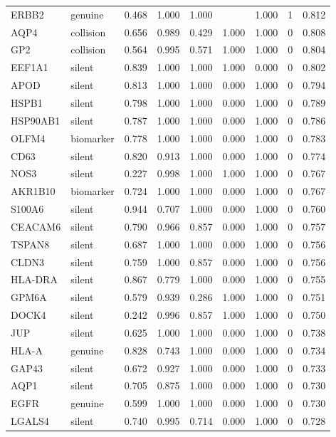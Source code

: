 \begin{longtable}{llrrrrrrr}
ERBB2 & genuine & 0.468 & 1.000 & 1.000 &  & 1.000 & 1 & 0.812\\
AQP4 & collision & 0.656 & 0.989 & 0.429 & 1.000 & 1.000 & 0 & 0.808\\
GP2 & collision & 0.564 & 0.995 & 0.571 & 1.000 & 1.000 & 0 & 0.804\\
EEF1A1 & silent & 0.839 & 1.000 & 1.000 & 1.000 & 0.000 & 0 & 0.802\\
APOD & silent & 0.813 & 1.000 & 1.000 & 0.000 & 1.000 & 0 & 0.794\\
HSPB1 & silent & 0.798 & 1.000 & 1.000 & 0.000 & 1.000 & 0 & 0.789\\
HSP90AB1 & silent & 0.787 & 1.000 & 1.000 & 0.000 & 1.000 & 0 & 0.786\\
OLFM4 & biomarker & 0.778 & 1.000 & 1.000 & 0.000 & 1.000 & 0 & 0.783\\
CD63 & silent & 0.820 & 0.913 & 1.000 & 0.000 & 1.000 & 0 & 0.774\\
NOS3 & silent & 0.227 & 0.998 & 1.000 & 1.000 & 1.000 & 0 & 0.767\\
AKR1B10 & biomarker & 0.724 & 1.000 & 1.000 & 0.000 & 1.000 & 0 & 0.767\\
S100A6 & silent & 0.944 & 0.707 & 1.000 & 0.000 & 1.000 & 0 & 0.760\\
CEACAM6 & silent & 0.790 & 0.966 & 0.857 & 0.000 & 1.000 & 0 & 0.757\\
TSPAN8 & silent & 0.687 & 1.000 & 1.000 & 0.000 & 1.000 & 0 & 0.756\\
CLDN3 & silent & 0.759 & 1.000 & 0.857 & 0.000 & 1.000 & 0 & 0.756\\
HLA-DRA & silent & 0.867 & 0.779 & 1.000 & 0.000 & 1.000 & 0 & 0.755\\
GPM6A & silent & 0.579 & 0.939 & 0.286 & 1.000 & 1.000 & 0 & 0.751\\
DOCK4 & silent & 0.242 & 0.996 & 0.857 & 1.000 & 1.000 & 0 & 0.750\\
JUP & silent & 0.625 & 1.000 & 1.000 & 0.000 & 1.000 & 0 & 0.738\\
HLA-A & genuine & 0.828 & 0.743 & 1.000 & 0.000 & 1.000 & 0 & 0.734\\
GAP43 & silent & 0.672 & 0.927 & 1.000 & 0.000 & 1.000 & 0 & 0.733\\
AQP1 & silent & 0.705 & 0.875 & 1.000 & 0.000 & 1.000 & 0 & 0.730\\
EGFR & genuine & 0.599 & 1.000 & 1.000 & 0.000 & 1.000 & 0 & 0.730\\
LGALS4 & silent & 0.740 & 0.995 & 0.714 & 0.000 & 1.000 & 0 & 0.728\\

\end{longtable}
